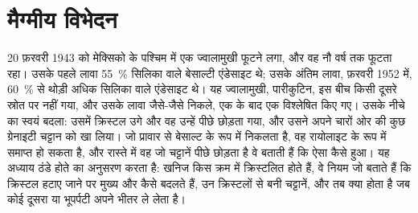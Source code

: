 \chapter{मैग्मीय विभेदन}\label{ch:b2:magmatic-differentiation}

20 फ़रवरी 1943 को मेक्सिको के पश्चिम में एक ज्वालामुखी फूटने लगा, और वह
नौ वर्ष तक फूटता रहा। उसके पहले लावा \qty{55}{\percent} सिलिका वाले बेसाल्टी
एंडेसाइट थे; उसके अंतिम लावा, फ़रवरी 1952 में,
\qty{60}{\percent} से थोड़ी अधिक सिलिका वाले एंडेसाइट थे। यह ज्वालामुखी, पारीकुटिन, इस बीच
किसी दूसरे स्रोत पर नहीं गया, और उसके लावा जैसे-जैसे निकले, एक के बाद एक विश्लेषित किए गए।
उसके नीचे का  स्वयं बदला: उसमें क्रिस्टल उगे और वह उन्हें पीछे छोड़ता गया, और उसने
अपने चारों ओर की कुछ ग्रेनाइटी चट्टान को खा लिया। जो  प्रावार से बेसाल्ट के रूप में निकलता है,
वह रायोलाइट के रूप में समाप्त हो सकता है, और रास्ते में वह जो चट्टानें पीछे छोड़ता है वे बताती हैं कि ऐसा कैसे हुआ।
यह अध्याय ठंडे होते  का अनुसरण करता है: खनिज किस क्रम में क्रिस्टलित होते हैं,
वे नियम जो बताते हैं कि क्रिस्टल हटाए जाने पर मुख्य और  कैसे बदलते हैं,
उन क्रिस्टलों से बनी चट्टानें, और तब क्या होता है जब 
कोई दूसरा  या भूपर्पटी अपने भीतर ले लेता है।

